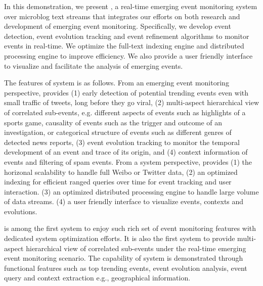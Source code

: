 In this demonstration, we present \ring, a real-time emerging event monitoring system over microblog text streams that integrates our efforts on both research and development of emerging event monitoring.
Specifically, we develop event detection, event evolution tracking and event refinement algorithms to monitor events in real-time.
We optimize the full-text indexing engine and distributed processing engine to improve efficiency.
We also provide a user friendly interface to visualize and facilitate the analysis of emerging events.

The features of \ring system is as follows.
%
From an emerging event monitoring perspective, \ring provides
(1) early detection of potential trending events even with small traffic of tweets, long before they go viral, 
(2) multi-aspect hierarchical view of correlated sub-events, e.g. different aspects of events such as highlights of a sports game, causality of events such as the trigger and outcome of an investigation, or categorical structure of events such as different genres of detected news reports,
(3) event evolution tracking to monitor the temporal development of an event and trace of its origin, and
(4) context information of events and filtering of spam events.
From a system perspective, \ring provides
(1) the horizonal scalability to handle full Weibo or Twitter data,
(2) an optimized indexing for efficient ranged queries over time for event tracking and user interaction.
(3) an optimized distributed processing engine to handle large volume of data streams.
(4) a user friendly  interface to visualize events, contexts and evolutions.

\ring is among the first system to enjoy such rich set of event monitoring features with dedicated system optimization efforts.
It is also the first system to provide multi-aspect hierarchical view of correlated sub-events under the real-time emerging event monitoring scenario.
The capability of \ring system is demonstrated through functional features such as top trending events, event evolution analysis, event query and context extraction e.g., geographical information.

